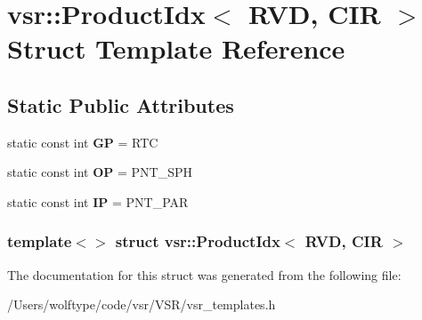 \hypertarget{structvsr_1_1_product_idx_3_01_r_v_d_00_01_c_i_r_01_4}{\section{vsr\-:\-:Product\-Idx$<$ R\-V\-D, C\-I\-R $>$ Struct Template Reference}
\label{structvsr_1_1_product_idx_3_01_r_v_d_00_01_c_i_r_01_4}
}
\subsection*{Static Public Attributes}
\begin{DoxyCompactItemize}
\item 
\hypertarget{structvsr_1_1_product_idx_3_01_r_v_d_00_01_c_i_r_01_4_aa2063f83ade3410f0e9a7ae80f0c77ef}{static const int {\bfseries G\-P} = R\-T\-C}\label{structvsr_1_1_product_idx_3_01_r_v_d_00_01_c_i_r_01_4_aa2063f83ade3410f0e9a7ae80f0c77ef}

\item 
\hypertarget{structvsr_1_1_product_idx_3_01_r_v_d_00_01_c_i_r_01_4_accb9a7c3e6b4fc3a3a03627d10dbb501}{static const int {\bfseries O\-P} = P\-N\-T\-\_\-\-S\-P\-H}\label{structvsr_1_1_product_idx_3_01_r_v_d_00_01_c_i_r_01_4_accb9a7c3e6b4fc3a3a03627d10dbb501}

\item 
\hypertarget{structvsr_1_1_product_idx_3_01_r_v_d_00_01_c_i_r_01_4_a8cc2ea1560e3634606526afcc5c09fa7}{static const int {\bfseries I\-P} = P\-N\-T\-\_\-\-P\-A\-R}\label{structvsr_1_1_product_idx_3_01_r_v_d_00_01_c_i_r_01_4_a8cc2ea1560e3634606526afcc5c09fa7}

\end{DoxyCompactItemize}
\subsubsection*{template$<$$>$ struct vsr\-::\-Product\-Idx$<$ R\-V\-D, C\-I\-R $>$}



The documentation for this struct was generated from the following file\-:\begin{DoxyCompactItemize}
\item 
/\-Users/wolftype/code/vsr/\-V\-S\-R/vsr\-\_\-templates.\-h\end{DoxyCompactItemize}
